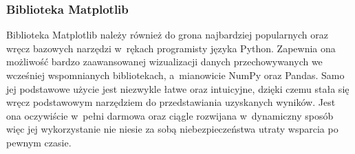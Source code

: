 \documentclass[../Kamil_Kowalewski_Main.tex]{subfiles}
\begin{document}
{{{            \subsubsection{Biblioteka Matplotlib}
            \label{chapter4:srodowisko_eksperymentalne:impl_programu:bib:} {
                Biblioteka Matplotlib\cite{website:matplotlib} należy również do grona
                najbardziej popularnych oraz wręcz bazowych narzędzi w~rękach
                programisty języka Python. Zapewnia ona możliwość bardzo zaawansowanej
                wizualizacji danych przechowywanych we wcześniej wspomnianych
                bibliotekach, a~mianowicie NumPy oraz Pandas. Samo jej podstawowe użycie
                jest niezwykle łatwe oraz intuicyjne, dzięki czemu stała się wręcz
                podstawowym narzędziem do przedstawiania uzyskanych wyników. Jest ona
                oczywiście w~pełni darmowa oraz ciągle rozwijana w~dynamiczny sposób
                więc jej wykorzystanie nie niesie za sobą niebezpieczeństwa utraty
                wsparcia po pewnym czasie.

            }

}}}
\end{document}
